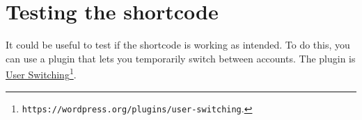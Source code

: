 \documentclass[a4paper,10pt]{article}
\begin{document}
\section{Testing the shortcode}

It could be useful to test if the shortcode is working as intended. To do this, you can use a plugin that lets you temporarily switch between accounts. The plugin is \href{https://wordpress.org/plugins/user-switching}{User Switching}\footnote{\texttt{https://wordpress.org/plugins/user-switching}.}.
\end{document}
